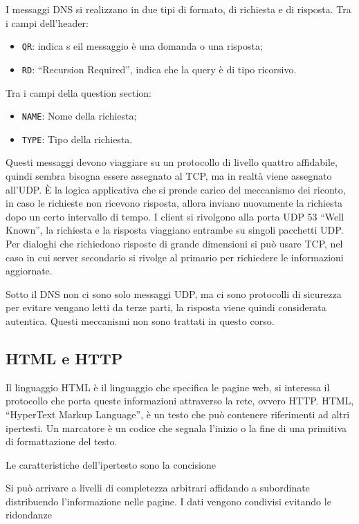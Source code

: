 \documentclass{article}
\numberwithin{equation}{subsection}
\begin{document}
I messaggi DNS si realizzano in due tipi di formato, di richiesta e di risposta. 
Tra i campi dell'header:
\begin{itemize}
    \item \texttt{QR}: indica s eil messaggio è una domanda o una risposta;
    \item \texttt{RD}: ``Recursion Required'', indica che la query è di tipo ricorsivo.
\end{itemize}
Tra i campi della question section:
\begin{itemize}
    \item \texttt{NAME}: Nome della richiesta;
    \item \texttt{TYPE}: Tipo della richiesta.
\end{itemize}


Questi messaggi devono viaggiare su un protocollo di livello quattro affidabile, quindi sembra bisogna essere assegnato al TCP, ma in realtà viene assegnato all'UDP. 
\`{E} la logica applicativa che si prende carico del meccanismo dei riconto, in caso le richieste non ricevono risposta, allora inviano nuovamente la richiesta dopo un 
certo intervallo di tempo. I client si rivolgono alla porta UDP 53 ``Well Known'', la richiesta e la risposta viaggiano entrambe su singoli pacchetti UDP. 
Per dialoghi che richiedono risposte di grande dimensioni si può usare TCP, nel caso in cui server secondario si rivolge al primario per richiedere le informazioni aggiornate. 

Sotto il DNS non ci sono solo messaggi UDP, ma ci sono protocolli di sicurezza per evitare vengano letti da terze parti, la risposta viene quindi considerata 
autentica. Questi meccanismi non sono trattati in questo corso. 


\subsection{HTML e HTTP}

Il linguaggio HTML è il linguaggio che specifica le pagine web, si interessa il protocollo che porta queste informazioni attraverso la rete, ovvero HTTP. 
HTML, ``HyperText Markup Language'', è un testo che può contenere riferimenti ad altri ipertesti. Un marcatore è un codice che segnala l'inizio o la fine di una primitiva  di 
formattazione del testo. 

Le caratteristiche dell'ipertesto sono la concisione 

Si può arrivare a livelli di completezza arbitrari affidando a subordinate distribuendo l'informazione nelle pagine. 
I dati vengono condivisi evitando le ridondanze 
\end{document}
